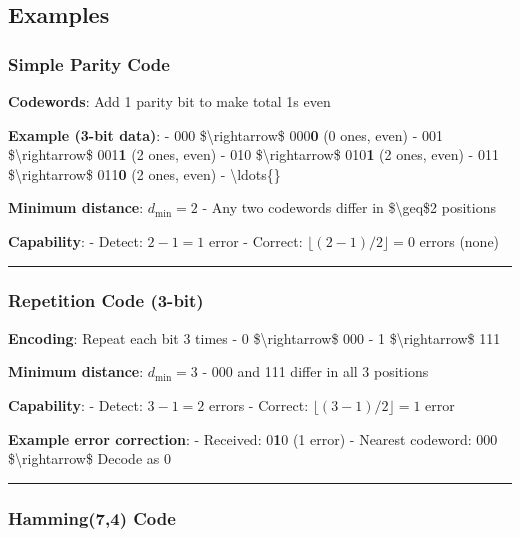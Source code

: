 \subsection{Examples}\label{examples}

\subsubsection{Simple Parity Code}\label{simple-parity-code}

\textbf{Codewords}: Add 1 parity bit to make total 1\textquotesingle s
even

\textbf{Example (3-bit data)}: - 000 \$\textbackslash rightarrow\$
000\textbf{0} (0 ones, even) - 001 \$\textbackslash rightarrow\$
001\textbf{1} (2 ones, even) - 010 \$\textbackslash rightarrow\$
010\textbf{1} (2 ones, even) - 011 \$\textbackslash rightarrow\$
011\textbf{0} (2 ones, even) - \textbackslash ldots\{\}

\textbf{Minimum distance}: \(d_{\min} = 2\) - Any two codewords differ
in \$\textbackslash geq\$2 positions

\textbf{Capability}: - Detect: \(2 - 1 = 1\) error - Correct:
\(\lfloor(2-1)/2\rfloor = 0\) errors (none)

\begin{center}\rule{0.5\linewidth}{0.5pt}\end{center}

\subsubsection{Repetition Code (3-bit)}\label{repetition-code-3-bit}

\textbf{Encoding}: Repeat each bit 3 times - 0
\$\textbackslash rightarrow\$ 000 - 1 \$\textbackslash rightarrow\$ 111

\textbf{Minimum distance}: \(d_{\min} = 3\) - 000 and 111 differ in all
3 positions

\textbf{Capability}: - Detect: \(3 - 1 = 2\) errors - Correct:
\(\lfloor(3-1)/2\rfloor = 1\) error

\textbf{Example error correction}: - Received: 0\textbf{1}0 (1 error) -
Nearest codeword: 000 \$\textbackslash rightarrow\$ Decode as 0

\begin{center}\rule{0.5\linewidth}{0.5pt}\end{center}

\subsubsection{Hamming(7,4) Code}\label{hamming74-code}

